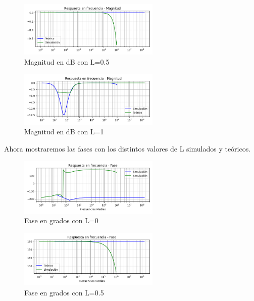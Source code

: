 \begin{figure}[H]
	\centering
	\includegraphics[width=0.6\textwidth]{../Ejercicio4-EcualizadorDeFase/Informe/lowFrecL050Mag.png} 
	\caption{Magnitud en dB con L=0.5}
	\label{lowMagL05}
\end{figure}

\begin{figure}[H]
	\centering
	\includegraphics[width=0.6\textwidth]{../Ejercicio4-EcualizadorDeFase/Informe/lowFrecL100Mag.png} 
	\caption{Magnitud en dB con L=1}
	\label{lowMagL10}
\end{figure}


Ahora mostraremos las fases con los distintos valores de L simulados y teóricos.

\begin{figure}[H]
	\centering
	\includegraphics[width=0.6\textwidth]{../Ejercicio4-EcualizadorDeFase/Informe/lowFrecL000Fase.png} 
	\caption{Fase en grados con L=0}
	\label{lowFaseL00}
\end{figure}
	
\begin{figure}[H]
	\centering
	\includegraphics[width=0.6\textwidth]{../Ejercicio4-EcualizadorDeFase/Informe/lowFrecL050Fase.png} 
	\caption{Fase en grados con L=0.5}
	\label{lowFaseL05}
\end{figure}


